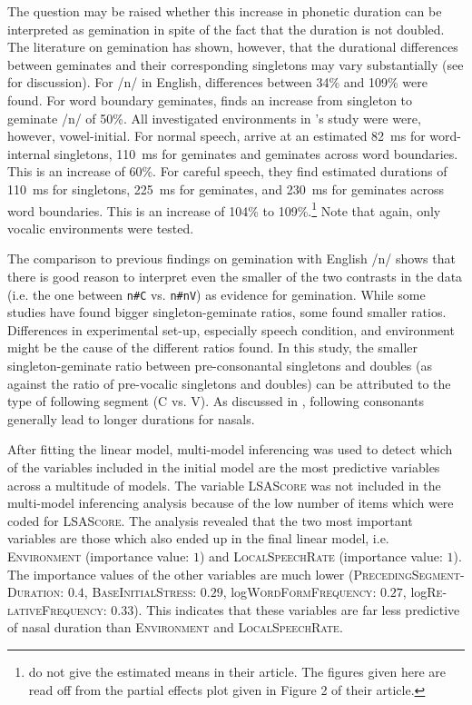 The question may be raised whether this increase in phonetic duration can be interpreted as gemination in spite of the fact that the duration is not doubled. The literature on gemination has shown, however, that the durational differences between geminates and their corresponding singletons may vary substantially (see  for discussion). 
For /n/ in English, differences between 34\% and 109\% were found. For word boundary geminates, \cite{Delattre.} finds  an increase from singleton to geminate /n/ of 50\%.  All investigated environments in \citeauthor{Delattre.}'s study were were, however, vowel-initial.  For normal speech, \citet[86, Figure 2]{Oh.2012} arrive at an estimated 82~ms for word-internal singletons, 110~ms for geminates and geminates across word boundaries. This is an increase of 60\%. For careful speech, they find estimated durations of 110~ms for singletons, 225~ms for geminates, and 230~ms for geminates across word boundaries. This is an increase of 104\% to 109\%.\footnote{\citet{Oh.2012} do not give the estimated means in their article. The figures given here are read off from the partial effects plot given in Figure 2 of their article.} Note that again, only vocalic environments were tested.

The comparison to previous findings on gemination with English /n/ shows that there is good reason to interpret even the smaller of the two contrasts in the data (i.e. the one between \texttt{n\#C} vs. \texttt{n\#nV}) as evidence for gemination. While some studies have found bigger singleton-geminate ratios, some found smaller ratios. Differences in experimental set-up, especially speech condition, and  environment might be the cause of the different ratios found. In this study, the smaller singleton-geminate ratio between pre-consonantal singletons and doubles  (as against the ratio of pre-vocalic singletons and doubles) can be attributed to the type of following segment (C vs. V). As discussed in , following consonants generally lead to longer durations for nasals.

After fitting the linear model, multi-model inferencing was used to detect which of the variables included in the initial model are the most predictive variables across a multitude of models. The variable \textsc{LSAScore} was not included in the multi-model inferencing analysis because of the low number of items which were coded for \textsc{LSAScore}. 
The analysis revealed that the two most important variables are those which also ended up in the final linear model, i.e. \textsc{Environment} (importance value: $1$) and \textsc{LocalSpeechRate} (importance value: $1$).  The importance values of the other variables are much lower (\textsc{PrecedingSegment-Duration}:  $0.4$, \textsc{BaseInitialStress}: $0.29$, log\textsc{WordFormFrequency}: $0.27$, log\textsc{Re-lativeFrequency}: $0.33$). This indicates that these variables are far less predictive of nasal duration than \textsc{Environment} and \textsc{LocalSpeechRate}. 


